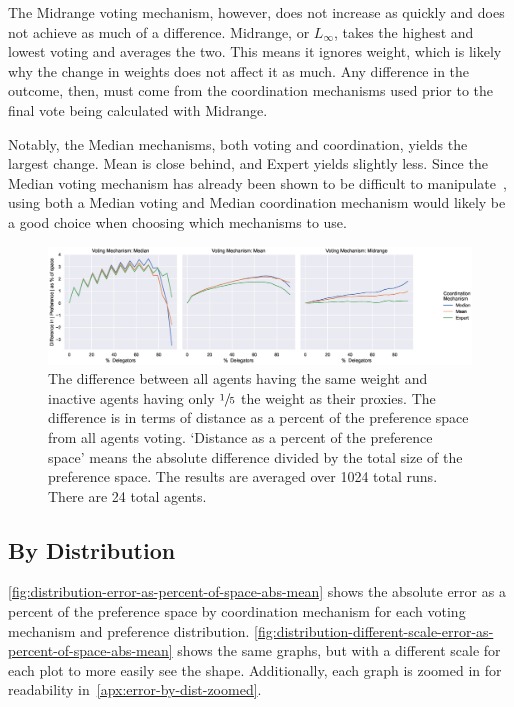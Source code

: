 The Midrange voting mechanism, however, does not increase as quickly and does not
achieve as much of a difference.
Midrange, or $L_{\infty}$, takes the highest and lowest voting and averages the two.
This means it ignores weight, which is likely why the change in weights does not
affect it as much.
Any difference in the outcome, then, must come from the coordination mechanisms used
prior to the final vote being calculated with Midrange.

Notably, the Median mechanisms, both voting and coordination, yields the largest
change.
Mean is close behind, and Expert yields slightly less.
Since the Median voting mechanism has already been shown to be difficult to
manipulate~\cite{Moulin1980}, using both a Median voting and Median coordination
mechanism would likely be a good choice when choosing which mechanisms to use.

\begin{landscape}
    \begin{figure}[p]
        \centering
        \includegraphics[scale=0.55]
        {content/chapter2/figures/different_weight/difference_abs_pref_percent_of_space}
        \caption{
            The difference between all agents having the same weight and inactive
            agents having only $\sfrac{1}{5}$ the weight as their proxies.
            The difference is in terms of distance as a percent of the preference
            space from all agents voting.
            `Distance as a percent of the preference space' means the absolute
            difference divided by the total size of the preference space.
            The results are averaged over 1024 total runs.
            There are 24 total agents.
        }
        \label{fig:different-weight-comparison}
    \end{figure}
\end{landscape}

\subsection{By Distribution}\label{subsec:results-distribution}
\autoref{fig:distribution-error-as-percent-of-space-abs-mean} shows
the absolute error as a percent of the preference space by coordination mechanism for
each voting mechanism and preference distribution.
\autoref{fig:distribution-different-scale-error-as-percent-of-space-abs-mean} shows
the same graphs, but with a different scale for each plot to more easily see the shape.
Additionally, each graph is zoomed in for readability
in~\autoref{apx:error-by-dist-zoomed}.

